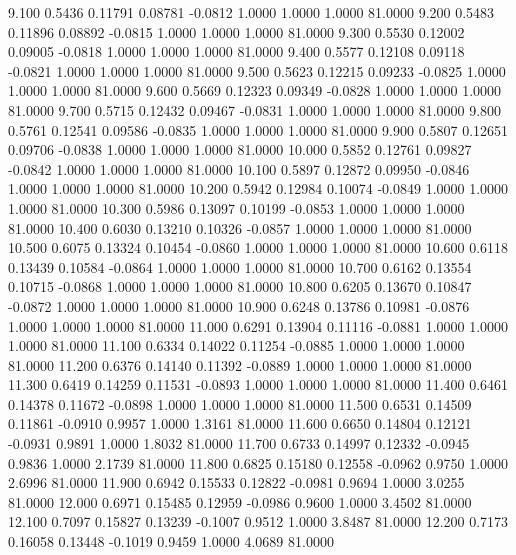    9.100   0.5436   0.11791   0.08781  -0.0812   1.0000   1.0000   1.0000  81.0000
   9.200   0.5483   0.11896   0.08892  -0.0815   1.0000   1.0000   1.0000  81.0000
   9.300   0.5530   0.12002   0.09005  -0.0818   1.0000   1.0000   1.0000  81.0000
   9.400   0.5577   0.12108   0.09118  -0.0821   1.0000   1.0000   1.0000  81.0000
   9.500   0.5623   0.12215   0.09233  -0.0825   1.0000   1.0000   1.0000  81.0000
   9.600   0.5669   0.12323   0.09349  -0.0828   1.0000   1.0000   1.0000  81.0000
   9.700   0.5715   0.12432   0.09467  -0.0831   1.0000   1.0000   1.0000  81.0000
   9.800   0.5761   0.12541   0.09586  -0.0835   1.0000   1.0000   1.0000  81.0000
   9.900   0.5807   0.12651   0.09706  -0.0838   1.0000   1.0000   1.0000  81.0000
  10.000   0.5852   0.12761   0.09827  -0.0842   1.0000   1.0000   1.0000  81.0000
  10.100   0.5897   0.12872   0.09950  -0.0846   1.0000   1.0000   1.0000  81.0000
  10.200   0.5942   0.12984   0.10074  -0.0849   1.0000   1.0000   1.0000  81.0000
  10.300   0.5986   0.13097   0.10199  -0.0853   1.0000   1.0000   1.0000  81.0000
  10.400   0.6030   0.13210   0.10326  -0.0857   1.0000   1.0000   1.0000  81.0000
  10.500   0.6075   0.13324   0.10454  -0.0860   1.0000   1.0000   1.0000  81.0000
  10.600   0.6118   0.13439   0.10584  -0.0864   1.0000   1.0000   1.0000  81.0000
  10.700   0.6162   0.13554   0.10715  -0.0868   1.0000   1.0000   1.0000  81.0000
  10.800   0.6205   0.13670   0.10847  -0.0872   1.0000   1.0000   1.0000  81.0000
  10.900   0.6248   0.13786   0.10981  -0.0876   1.0000   1.0000   1.0000  81.0000
  11.000   0.6291   0.13904   0.11116  -0.0881   1.0000   1.0000   1.0000  81.0000
  11.100   0.6334   0.14022   0.11254  -0.0885   1.0000   1.0000   1.0000  81.0000
  11.200   0.6376   0.14140   0.11392  -0.0889   1.0000   1.0000   1.0000  81.0000
  11.300   0.6419   0.14259   0.11531  -0.0893   1.0000   1.0000   1.0000  81.0000
  11.400   0.6461   0.14378   0.11672  -0.0898   1.0000   1.0000   1.0000  81.0000
  11.500   0.6531   0.14509   0.11861  -0.0910   0.9957   1.0000   1.3161  81.0000
  11.600   0.6650   0.14804   0.12121  -0.0931   0.9891   1.0000   1.8032  81.0000
  11.700   0.6733   0.14997   0.12332  -0.0945   0.9836   1.0000   2.1739  81.0000
  11.800   0.6825   0.15180   0.12558  -0.0962   0.9750   1.0000   2.6996  81.0000
  11.900   0.6942   0.15533   0.12822  -0.0981   0.9694   1.0000   3.0255  81.0000
  12.000   0.6971   0.15485   0.12959  -0.0986   0.9600   1.0000   3.4502  81.0000
  12.100   0.7097   0.15827   0.13239  -0.1007   0.9512   1.0000   3.8487  81.0000
  12.200   0.7173   0.16058   0.13448  -0.1019   0.9459   1.0000   4.0689  81.0000
